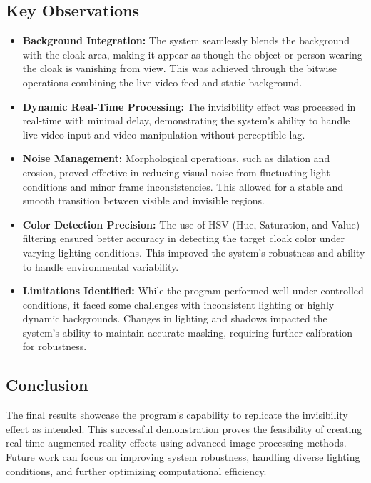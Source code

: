 \documentclass[onecolumn]{article} %
\begin{document}
\subsection{Key Observations}

\begin{itemize}
    \item \textbf{Background Integration:} The system seamlessly blends the background with the cloak area, making it appear as though the object or person wearing the cloak is vanishing from view. This was achieved through the bitwise operations combining the live video feed and static background.
    
    \item \textbf{Dynamic Real-Time Processing:} The invisibility effect was processed in real-time with minimal delay, demonstrating the system's ability to handle live video input and video manipulation without perceptible lag.
    
    \item \textbf{Noise Management:} Morphological operations, such as dilation and erosion, proved effective in reducing visual noise from fluctuating light conditions and minor frame inconsistencies. This allowed for a stable and smooth transition between visible and invisible regions.
    
    \item \textbf{Color Detection Precision:} The use of HSV (Hue, Saturation, and Value) filtering ensured better accuracy in detecting the target cloak color under varying lighting conditions. This improved the system's robustness and ability to handle environmental variability.
    
    \item \textbf{Limitations Identified:} While the program performed well under controlled conditions, it faced some challenges with inconsistent lighting or highly dynamic backgrounds. Changes in lighting and shadows impacted the system's ability to maintain accurate masking, requiring further calibration for robustness.
\end{itemize}

\subsection{Conclusion}

The final results showcase the program's capability to replicate the invisibility effect as intended. This successful demonstration proves the feasibility of creating real-time augmented reality effects using advanced image processing methods. Future work can focus on improving system robustness, handling diverse lighting conditions, and further optimizing computational efficiency.
\end{document}
